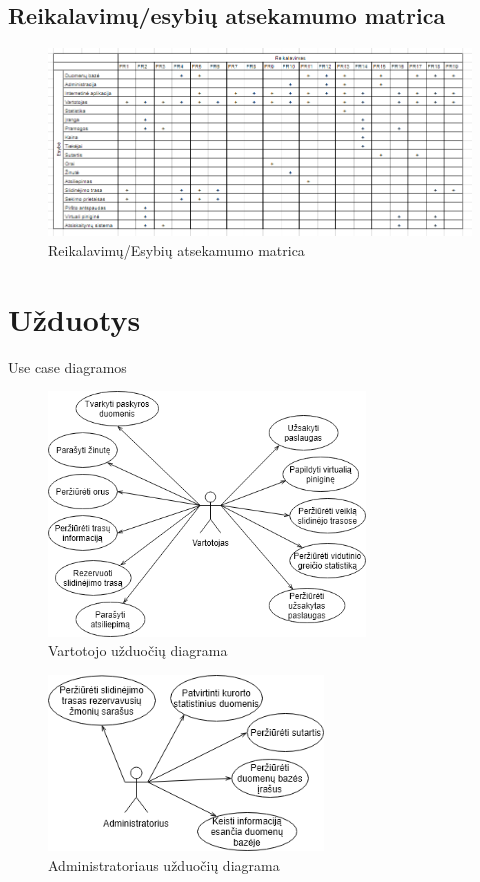 \documentclass[oneside]{VUMIFPSkursinis}
\begin{document}
\subsection{Reikalavimų/esybių atsekamumo matrica}	
\begin{figure}[h]
    \centering
    \includegraphics[width=1\textwidth]{Reikalavimai_Esybes.png}
    \caption{Reikalavimų/Esybių atsekamumo matrica}
    \label{fig:r/e_matrica}
\end{figure}
\section{Užduotys}
\Large{Use case diagramos}
\begin{figure}[h]
    \centering
    \includegraphics[width=0.75\textwidth]{useCaseVartotojas.png}
    \caption{Vartotojo užduočių diagrama}
    \label{fig:VartotojoUseCasel}
\end{figure}
\vskip 1cm
\begin{figure}[h]
    \centering
    \includegraphics[width=0.65\textwidth]{useCaseAdministratorius.png}
    \caption{Administratoriaus užduočių diagrama}
    \label{fig:AdministratoriausUseCase}
\end{figure}
\end{document}
